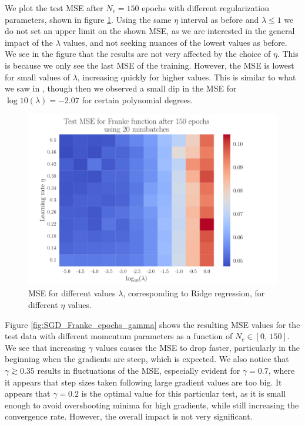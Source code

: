 \documentclass[12pt]{extarticle}
\begin{document}
We plot the test MSE after $N_e=150$ epochs with different regularization parameters, shown in figure \ref{fig:SGD_Franke_lambda_eta}. Using the same $\eta$ interval as before and $\lambda\leq1$ we do not set an upper limit on the shown MSE, as we are interested in the general impact of the $\lambda$ values, and not seeking nuances of the lowest values as before.
We see in the figure that the results are not very affected by the choice of $\eta$. This is because we only see the last MSE of the training. However, the MSE is lowest for small values of $\lambda$, increasing quickly for higher values. This is similar to what we saw in \cite{project1}, though then we observed a small dip in the MSE for $\log10(\lambda)=-2.07$ for certain polynomial degrees.


\begin{figure}[h!]
	\includegraphics[width=0.9\linewidth]{SGD_Franke/reg_Franke__lambda_eta__Test_MSE__764274.pdf}
	\caption{MSE for different values $\lambda$, corresponding to Ridge regression, for different $\eta$ values.}
	\label{fig:SGD_Franke_lambda_eta}
\end{figure}


Figure \ref{fig:SGD_Franke_epochs_gamma} shows the resulting MSE values for the test data with different momentum parameters as a function of $N_e\in[0,\,150]$. We see that increasing $\gamma$ values causes the MSE to drop faster, particularly in the beginning when the gradients are steep, which is expected. We also notice that $\gamma\gtrsim0.35$ results in fluctuations of the MSE, especially evident for $\gamma=0.7$, where it appears that step sizes taken following large gradient values are too big. It appears that $\gamma=0.2$ is the optimal value for this particular test, as it is small enough to avoid overshooting minima for high gradients, while still increasing the convergence rate. However, the overall impact is not very significant.
\end{document}

